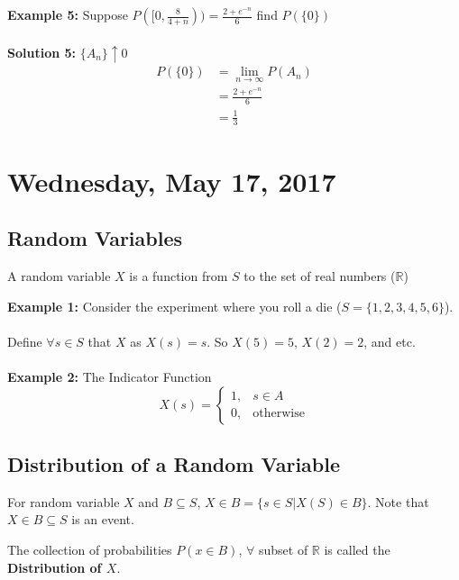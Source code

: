 \documentclass[12pt, twoside]{article}
\begin{document}
\textbf{Example 5:} Suppose $P([0,\frac{8}{4+n})) = \frac{2 + e^{-n}}{6}$ find $P(\{ 0 \})$\\\\
\textbf{Solution 5:} $\{A_n\}\uparrow 0$\\
\begin{align*}
	P(\{ 0 \}) &= \lim_{n\to\infty} P(A_n)\\
	&= \frac{2 + e^{-n}}{6}\\
	&= \frac{1}{3}
\end{align*}

\section{Wednesday, May 17, 2017}

\subsection{Random Variables}

\begin{tcolorbox}[title=Definition: Random Variables]
	A random variable $X$ is a function from $S$ to the set of real numbers ($\mathbb{R}$)
\end{tcolorbox}

\textbf{Example 1:} Consider the experiment where you roll a die ($S = \{ 1,2,3,4,5,6 \}$).\\
\\
Define $\forall s\in S$ that $X$ as $X(s) = s$. So $X(5) = 5$, $X(2) = 2$, and etc.
\\
\\
\textbf{Example 2:} The Indicator Function\\
$$X(s) =
\begin{cases}
	1, & s \in A\\
	0, & \text{otherwise}
\end{cases}
$$

\subsection{Distribution of a Random Variable}

\begin{tcolorbox}
	For random variable $X$ and $B \subseteq S$, $X \in B = \{ s \in S | X(S) \in B \}$. Note that $X \in B \subseteq S$ is an event.
\end{tcolorbox}

\begin{tcolorbox}[title=Definition: The Distribution of a Random Variable $X$]
	The collection of probabilities $P(x \in B)$, $\forall$ subset of $\mathbb{R}$ is called the \textbf{Distribution of $X$}.
\end{tcolorbox}
\end{document}

